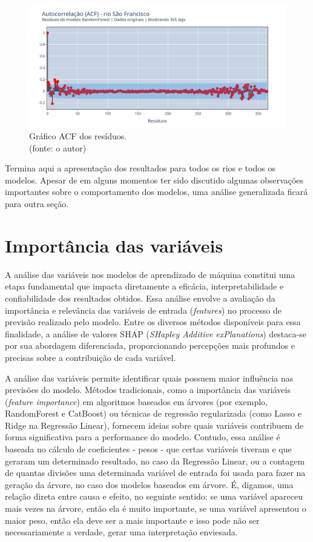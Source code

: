 \begin{figure}[!h]
\centering
\includegraphics[scale=0.33]{Figuras/rio_sao_francisco/wfv/RF/RF_WFV_ORIG_RESID_ACF.png}
\caption{Gráfico ACF dos resíduos.\\(fonte: o autor)}
\label{fig:francisco_RF_WFV_ORIG_RESID_ACF}
\end{figure}
\clearpage

Termina aqui a apresentação dos resultados para todos os rios e todos os modelos. Apesar de em alguns momentos ter sido discutido algumas observações importantes sobre o comportamento dos modelos, uma análise generalizada ficará para outra seção.

\section{Importância das variáveis}

A análise das variáveis nos modelos de aprendizado de máquina constitui uma etapa fundamental que impacta diretamente a eficácia, interpretabilidade e confiabilidade dos resultados obtidos.\cite{molnar_2024a} Essa análise envolve a avaliação da importância e relevância das variáveis de entrada (\textit{features}) no processo de previsão realizado pelo modelo. Entre os diversos métodos disponíveis para essa finalidade, a análise de valores SHAP (\textit{SHapley Additive exPlanations}) destaca-se por sua abordagem diferenciada, proporcionando percepções mais profundos e precisas sobre a contribuição de cada variável.

A análise das variáveis permite identificar quais possuem maior influência nas previsões do modelo. Métodos tradicionais, como a importância das variáveis (\textit{feature importance}) em algoritmos baseados em árvores (por exemplo, RandomForest e CatBoost) ou técnicas de regressão regularizada (como Lasso e Ridge na Regressão Linear), fornecem ideias sobre quais variáveis contribuem de forma significativa para a performance do modelo. Contudo, essa análise é baseada no cálculo de coeficientes - pesos - que certas variáveis tiveram e que geraram um determinado resultado, no caso da Regressão Linear, ou a contagem de quantas divisões uma determinada variável de entrada foi usada para fazer na geração da árvore, no caso dos modelos baseados em árvore. É, digamos, uma relação direta entre causa e efeito, no seguinte sentido: se uma variável apareceu mais vezes na árvore, então ela é muito importante, se uma variável apresentou o maior peso, então ela deve ser a mais importante e isso pode não ser necessariamente a verdade, gerar uma interpretação enviesada.

